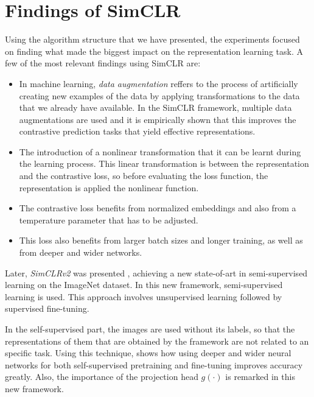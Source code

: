 \section{Findings of SimCLR}

    Using the algorithm structure that we have presented, the experiments focused on finding what made the biggest impact on the representation learning task. A few of the most relevant findings using SimCLR are: 
    \begin{itemize}
    \item In machine learning, \emph{data augmentation} reffers to the process of artificially creating new examples of the data by applying transformations to the data that we already have available. In the SimCLR framework, multiple data augmentations are used and it is empirically shown that this improves the contrastive prediction tasks that yield effective representations.
    
    \item The introduction of a nonlinear transformation that it can be learnt during the learning process. This linear transformation is between the representation and the contrastive loss, so before evaluating the loss function, the representation is applied the nonlinear function.
    
    \item The contrastive loss benefits from normalized embeddings and also from a temperature parameter that has to be adjusted.
    
    \item This loss also benefits from larger batch sizes and longer training, as well as from deeper and wider networks.
\end{itemize}

Later, \emph{SimCLRv2} was presented \citep{chen2020big}, achieving a new state-of-art in semi-supervised learning on the ImageNet dataset. In this new framework, semi-supervised learning is used. This approach involves unsupervised learning followed by supervised fine-tuning\footnotemark.


In the self-supervised part, the images are used without its labels, so that the representations of them that are obtained by the framework are not related to an specific task. Using this technique, \cite{chen2020big} shows how using deeper and wider neural networks for both self-supervised pretraining and fine-tuning improves accuracy greatly. Also, the importance of the projection head $g(\cdot)$ is remarked in this new framework.
